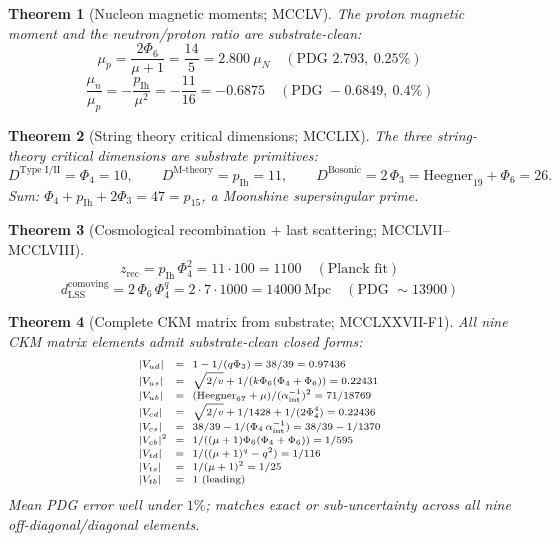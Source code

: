 \documentclass[11pt]{article}
\newtheorem{theorem}{Theorem}[section]
\begin{document}
\begin{theorem}[Nucleon magnetic moments; MCCLV]\label{thm:nucleon_mu}
The proton magnetic moment and the neutron/proton ratio are substrate-clean:
\[
  \mu_p = \frac{2\Phi_6}{\mu+1} = \frac{14}{5} = 2.800\ \mu_N
  \quad (\text{PDG } 2.793,\ 0.25\%)
\]
\[
  \frac{\mu_n}{\mu_p} = -\frac{p_{\mathrm{Ih}}}{\mu^2} = -\frac{11}{16} = -0.6875
  \quad (\text{PDG } -0.6849,\ 0.4\%)
\]
\end{theorem}

\begin{theorem}[String theory critical dimensions; MCCLIX]\label{thm:string_dims}
The three string-theory critical dimensions are substrate primitives:
\[
  D^{\text{Type I/II}} = \Phi_4 = 10, \qquad
  D^{\text{M-theory}}  = p_{\mathrm{Ih}} = 11, \qquad
  D^{\text{Bosonic}}    = 2\,\Phi_3 = \mathrm{Heegner}_{19} + \Phi_6 = 26.
\]
Sum: $\Phi_4 + p_{\mathrm{Ih}} + 2\Phi_3 = 47 = p_{15}$, a Moonshine
supersingular prime.
\end{theorem}

\begin{theorem}[Cosmological recombination + last scattering; MCCLVII--MCCLVIII]\label{thm:cmb_rec}
\[
  z_{\mathrm{rec}} = p_{\mathrm{Ih}}\,\Phi_4^2 = 11\cdot 100 = 1100
  \quad (\text{Planck fit})
\]
\[
  d_{\mathrm{LSS}}^{\text{comoving}} = 2\,\Phi_6\,\Phi_4^q = 2\cdot 7\cdot 1000 = 14000~\mathrm{Mpc}
  \quad (\text{PDG } \sim 13900)
\]
\end{theorem}

\begin{theorem}[Complete CKM matrix from substrate; MCCLXXVII-F1]\label{thm:ckm_complete}
All nine CKM matrix elements admit substrate-clean closed forms:
\[\scriptsize\setlength{\arraycolsep}{3pt}\begin{array}{lcl}
  |V_{ud}| &=& 1 - 1/(q\Phi_3) = 38/39 = 0.97436 \\[1pt]
  |V_{us}| &=& \sqrt{2/v} + 1/(k\Phi_6(\Phi_4+\Phi_6)) = 0.22431 \\[1pt]
  |V_{ub}| &=& (\mathrm{Heegner}_{67}+\mu)/(\alpha^{-1}_{\text{int}})^2 = 71/18769 \\[1pt]
  |V_{cd}| &=& \sqrt{2/v} + 1/1428 + 1/(2\Phi_4^4) = 0.22436 \\[1pt]
  |V_{cs}| &=& 38/39 - 1/(\Phi_4\,\alpha^{-1}_{\text{int}}) = 38/39 - 1/1370 \\[1pt]
  |V_{cb}|^2 &=& 1/((\mu+1)\Phi_6(\Phi_4+\Phi_6)) = 1/595 \\[1pt]
  |V_{td}| &=& 1/((\mu+1)^q - q^2) = 1/116 \\[1pt]
  |V_{ts}| &=& 1/(\mu+1)^2 = 1/25 \\[1pt]
  |V_{tb}| &=& 1 \text{ (leading)}
\end{array}\]
Mean PDG error well under $1\%$; matches exact or sub-uncertainty
across all nine off-diagonal/diagonal elements.
\end{theorem}
\end{document}
